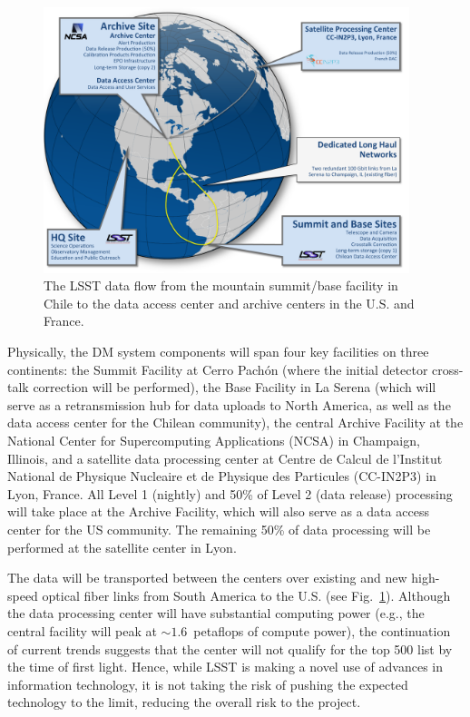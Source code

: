 \documentclass[11pt,twoside]{article}
\begin{document}
\begin{figure}[!t]
%
%
\begin{center}
\includegraphics[width=0.95\textwidth,clip]{DMX2.pdf}
\end{center}
\caption{The LSST data flow from the mountain summit/base facility in
Chile to the data access center and archive centers in the U.S. and France.}
\label{Fig:DM2}
\end{figure}

Physically, the DM system components will span four key facilities on three
continents: the Summit Facility at  Cerro Pach\'on (where the initial
detector cross-talk
correction will be performed), the Base Facility in La Serena (which will serve
as a retransmission hub for data
uploads to North America, as well as the data access center for the Chilean
community), the central Archive Facility at the National Center
for Supercomputing Applications (NCSA) in Champaign, Illinois, and a
satellite data processing center at Centre de Calcul de l'Institut National
de Physique Nucleaire et de Physique des Particules (CC-IN2P3) in Lyon, France.
All Level 1 (nightly) and 50\% of Level 2 (data release) processing will take place at the
Archive Facility, which will also serve as a data access center
for the US community. The remaining 50\% of data processing will be performed at
the satellite center in Lyon.

The data will be transported between the centers over existing and new high-speed optical fiber
links from South America to the U.S. (see Fig.~\ref{Fig:DM2}).
Although the data processing center will have substantial computing
power (e.g., the central facility will peak at $\sim 1.6$~petaflops of
compute power), the continuation of current trends suggests that the center will
not qualify for the top 500 list by the time of first light.
Hence, while LSST is making a novel use of advances in information technology,
it is not taking the risk of pushing the expected technology to the limit, reducing
the overall risk to the project.
\\
\end{document}
